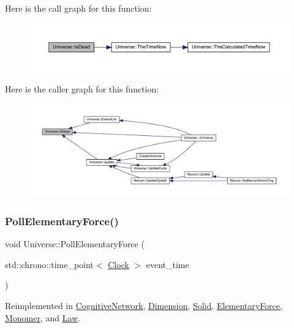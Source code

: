 Here is the call graph for this function\+:
\nopagebreak
\begin{figure}[H]
\begin{center}
\leavevmode
\includegraphics[width=350pt]{class_universe_a8fdaa6d06584e1ef50c4c613b22b786e_cgraph}
\end{center}
\end{figure}
Here is the caller graph for this function\+:
\nopagebreak
\begin{figure}[H]
\begin{center}
\leavevmode
\includegraphics[width=350pt]{class_universe_a8fdaa6d06584e1ef50c4c613b22b786e_icgraph}
\end{center}
\end{figure}
\mbox{\label{class_universe_a0c485c504542409cbb5cfd8543c35b11}} 
\subsubsection{\texorpdfstring{Poll\+Elementary\+Force()}{PollElementaryForce()}}
{\footnotesize\ttfamily void Universe\+::\+Poll\+Elementary\+Force (\begin{DoxyParamCaption}\item[{std\+::chrono\+::time\+\_\+point$<$ \hyperlink{universe_8h_a0ef8d951d1ca5ab3cfaf7ab4c7a6fd80}{Clock} $>$}]{event\+\_\+time }\end{DoxyParamCaption})\hspace{0.3cm}{\ttfamily [virtual]}}



Reimplemented in \hyperlink{class_cognitive_network_ac97c08a0af7dc0d02fbe059827b6be87}{Cognitive\+Network}, \hyperlink{class_dimension_a5b07f5c8558233c8f3488baf1fe3459a}{Dimension}, \hyperlink{class_solid_ae2a486e59f11f96a1a39756b3f3da53f}{Solid}, \hyperlink{class_elementary_force_aa5ab479744dbf3e8578f8d2974299ff7}{Elementary\+Force}, \hyperlink{class_monomer_a5b2375df1e19abdf6045c475d2ac23ca}{Monomer}, and \hyperlink{class_law_af99520c95b2cd8af0af110b78b2288ef}{Law}.



